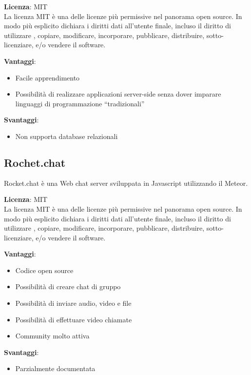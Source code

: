 \textbf{Licenza}: MIT \\
La licenza MIT è una delle licenze più permissive nel panorama open source. In modo più esplicito dichiara i diritti dati all'utente finale, incluso il diritto di utilizzare , copiare, modificare, incorporare, pubblicare, distribuire, sotto-licenziare, e/o vendere il software.

\textbf{Vantaggi}: 
\begin{itemize}
	\item Facile apprendimento
	\item Possibilità di realizzare applicazioni server-side senza dover imparare linguaggi di programmazione “tradizionali”
\end{itemize}

\textbf{Svantaggi}: 
\begin{itemize}
	\item Non supporta database relazionali
	
\end{itemize}

\subsection{Rochet.chat}

Rocket.chat è una Web chat server sviluppata in Javascript utilizzando il  Meteor.

\textbf{Licenza}: MIT \\
La licenza MIT è una delle licenze più permissive nel panorama open source. In modo più esplicito dichiara i diritti dati all'utente finale, incluso il diritto di utilizzare , copiare, modificare, incorporare, pubblicare, distribuire, sotto-licenziare, e/o vendere il software.

\textbf{Vantaggi}: 
\begin{itemize}

	\item Codice open source
	\item Possibilità di creare chat di gruppo
	\item Possibilità di inviare audio, video e file
	\item Possibilità di effettuare video chiamate
	\item Community molto attiva

	
\end{itemize}

\textbf{Svantaggi}: 
\begin{itemize}
	\item Parzialmente documentata
\end{itemize}

